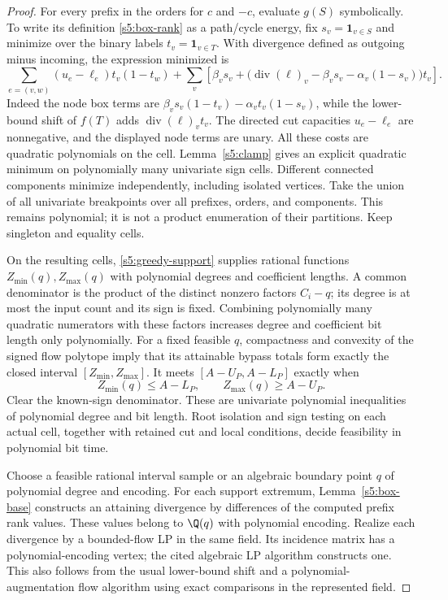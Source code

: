 \begin{proof}
For every prefix in the orders for $c$ and $-c$, evaluate $g(S)$
symbolically. To write its definition \eqref{s5:box-rank} as a path/cycle
energy, fix $s_v=\mathbf1_{v\in S}$ and minimize over the binary labels
$t_v=\mathbf1_{v\in T}$. With divergence defined as outgoing minus
incoming, the expression minimized is
\begin{equation}
 \sum_{e=(v,w)}(u_e-\ell_e)t_v(1-t_w)
 +\sum_v\left[\beta_vs_v+
 \bigl(\operatorname{div}(\ell)_v-\beta_vs_v
                  -\alpha_v(1-s_v)\bigr)t_v\right].
 \label{s5:rank-energy}
\end{equation}
Indeed the node box terms are
$\beta_vs_v(1-t_v)-\alpha_vt_v(1-s_v)$, while the lower-bound shift
of $f(T)$ adds $\operatorname{div}(\ell)_vt_v$.
The directed cut capacities $u_e-\ell_e$ are nonnegative, and the
displayed node terms are unary. All these costs are quadratic polynomials on the
cell. Lemma~\ref{s5:clamp} gives an explicit quadratic minimum on
polynomially many univariate sign cells. Different connected components
minimize independently, including isolated vertices. Take the union
of all univariate breakpoints over all prefixes, orders, and components.
This remains polynomial; it is not a product enumeration of their
partitions. Keep singleton and equality cells.

On the resulting cells, \eqref{s5:greedy-support} supplies rational
functions $Z_{\min}(q),Z_{\max}(q)$ with polynomial degrees and
coefficient lengths. A common denominator is the product of the
distinct nonzero factors $C_i-q$; its degree is at most the input count
and its sign is fixed. Combining polynomially many quadratic numerators
with these factors increases degree and coefficient bit length only polynomially.
For a fixed feasible $q$, compactness and convexity of the signed flow
polytope imply that its attainable bypass totals form exactly the closed
interval $[Z_{\min},Z_{\max}]$. It meets $[A-U_P,A-L_P]$ exactly when
\begin{equation}
 Z_{\min}(q)\le A-L_P,\qquad Z_{\max}(q)\ge A-U_P.
 \label{s5:capacity-test}
\end{equation}
Clear the known-sign denominator. These are univariate polynomial
inequalities of polynomial degree and bit length. Root isolation and
sign testing on each actual cell, together with retained cut and local
conditions, decide feasibility in polynomial bit time.

Choose a feasible rational interval sample or an algebraic boundary
point $q$ of polynomial degree and encoding. For each support extremum,
Lemma~\ref{s5:box-base} constructs an attaining divergence by differences
of the computed prefix rank values. These values belong to $\Q(q)$
with polynomial encoding. Realize each divergence by a bounded-flow LP
in the same field. Its incidence matrix has a polynomial-encoding
vertex; the cited algebraic LP algorithm constructs one. This also
follows from the usual lower-bound shift and a polynomial-augmentation
flow algorithm using exact comparisons in the represented field.


\end{proof}
